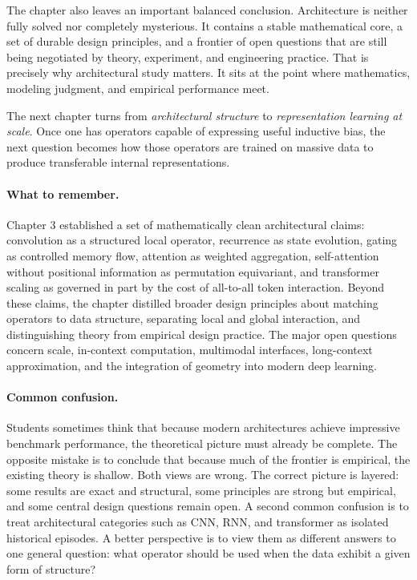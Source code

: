 The chapter also leaves an important balanced conclusion.
Architecture is neither fully solved nor completely mysterious.
It contains a stable mathematical core, a set of durable design principles, and a frontier of open questions that are still being negotiated by theory, experiment, and engineering practice.
That is precisely why architectural study matters.
It sits at the point where mathematics, modeling judgment, and empirical performance meet.

The next chapter turns from \emph{architectural structure} to \emph{representation learning at scale}.
Once one has operators capable of expressing useful inductive bias, the next question becomes how those operators are trained on massive data to produce transferable internal representations.

\paragraph{What to remember.}
Chapter 3 established a set of mathematically clean architectural claims: convolution as a structured local operator, recurrence as state evolution, gating as controlled memory flow, attention as weighted aggregation, self-attention without positional information as permutation equivariant, and transformer scaling as governed in part by the cost of all-to-all token interaction.
Beyond these claims, the chapter distilled broader design principles about matching operators to data structure, separating local and global interaction, and distinguishing theory from empirical design practice.
The major open questions concern scale, in-context computation, multimodal interfaces, long-context approximation, and the integration of geometry into modern deep learning.

\paragraph{Common confusion.}
Students sometimes think that because modern architectures achieve impressive benchmark performance, the theoretical picture must already be complete.
The opposite mistake is to conclude that because much of the frontier is empirical, the existing theory is shallow.
Both views are wrong.
The correct picture is layered:
some results are exact and structural, some principles are strong but empirical, and some central design questions remain open.
A second common confusion is to treat architectural categories such as CNN, RNN, and transformer as isolated historical episodes.
A better perspective is to view them as different answers to one general question: what operator should be used when the data exhibit a given form of structure?

